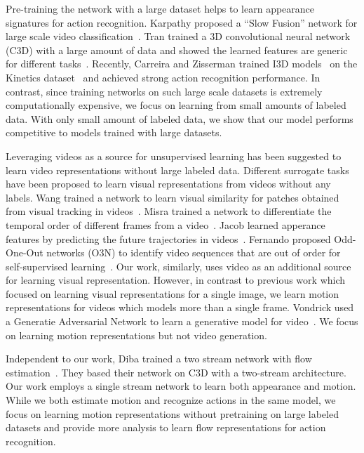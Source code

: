\documentclass[10pt,twocolumn,letterpaper]{article}
\begin{document}
Pre-training the network with a large dataset helps to learn appearance signatures for action recognition.
Karpathy \etal proposed a ``Slow Fusion'' network for large scale video classification~\cite{karpathyTSLSF14}.
Tran \etal trained a 3D convolutional neural network (C3D) with a large amount of data and showed the learned features are generic for different tasks~\cite{tranBFTP15}.
Recently, Carreira and Zisserman trained I3D models~\cite{carreira2017quo} on the Kinetics dataset~\cite{kay2017kinetics} and achieved strong action recognition performance.
In contrast, since training networks on such large scale datasets is extremely computationally expensive, we focus on learning from small amounts of labeled data.
With only small amount of labeled data, we show that our model performs competitive to models trained with large datasets.


Leveraging videos as a source for unsupervised learning has been suggested to learn video representations without large labeled data.
Different surrogate tasks have been proposed to learn visual representations from videos without any labels.
Wang \etal trained a network to learn visual similarity for patches obtained from visual tracking in videos~\cite{wang2015unsupervised}.
Misra \etal trained a network to differentiate the temporal order of different frames from a video~\cite{misra2016shuffle}.
Jacob \etal learned apperance features by predicting the future trajectories in videos~\cite{walker2016uncertain}.
Fernando \etal proposed Odd-One-Out networks (O3N) to identify video sequences that are out of order for self-supervised learning~\cite{fernando2016self}.
Our work, similarly, uses video as an additional source for learning visual representation.
However, in contrast to previous work which focused on learning visual representations for a single image, we learn motion representations for videos which models more than a single frame.
Vondrick \etal used a Generatie Adversarial Network to learn a generative model for video~\cite{vondrick2016generating}.
We focus on learning motion representations but not video generation.

Independent to our work, Diba \etal trained a two stream network with flow estimation~\cite{diba2016efficient}.
They based their network on C3D with a two-stream architecture.
Our work employs a single stream network to learn both appearance and motion.
While we both estimate motion and recognize actions in the same model, we focus on learning motion representations without pretraining on large labeled datasets and provide more analysis to learn flow representations for action recognition.
\end{document}
